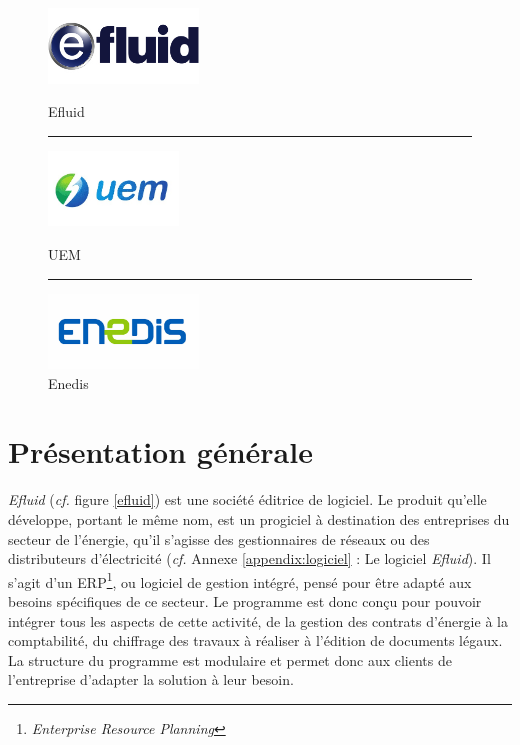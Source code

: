 \documentclass[a4paper, 12pt]{report}
\begin{document}
\begin{figure}[b]
  \begin{center}
    \begin{minipage}{4cm}
      \begin{center}
        \includegraphics[height=2cm]{../res/logo-efluid.jpg}
        \caption{Efluid}
        \label{efluid}
      \end{center}
    \end{minipage}
    \rule{1cm}{0cm}
    \begin{minipage}{4cm}
      \begin{center}
        \includegraphics[height=2cm]{../res/logo-uem.jpg}
        \caption{UEM}
        \label{uem}
      \end{center}
    \end{minipage}
    \rule{1cm}{0cm}
    \begin{minipage}{4cm}
      \begin{center}
        \includegraphics[height=2cm]{../res/logo-enedis.jpg}
        \caption{Enedis}
        \label{enedis}
      \end{center}
    \end{minipage}
  \end{center}
\end{figure}

\section{Présentation générale}

\textit{Efluid} (\textit{cf.} figure \ref{efluid}) est une société éditrice de logiciel. Le produit qu'elle développe, portant le même nom, est un progiciel à destination des entreprises du secteur de l'énergie, qu'il s'agisse des gestionnaires de réseaux ou des distributeurs d'électricité (\textit{cf.} Annexe \ref{appendix:logiciel} : Le logiciel \textit{Efluid}). Il s'agit d'un ERP\footnote{\textit{Enterprise Resource Planning}}, ou logiciel de gestion intégré, pensé pour être adapté aux besoins spécifiques de ce secteur. Le programme est donc conçu pour pouvoir intégrer tous les aspects de cette activité, de la gestion des contrats d'énergie à la comptabilité, du chiffrage des travaux à réaliser à l'édition de documents légaux. La structure du programme est modulaire et permet donc aux clients de l'entreprise d'adapter la solution à leur besoin.\\
\end{document}
